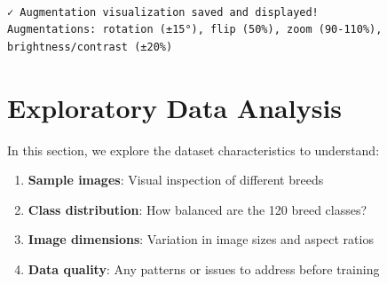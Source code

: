 \documentclass[
  letterpaper,
  DIV=11,
  numbers=noendperiod]{scrartcl}
\providecommand{\tightlist}{%
  \setlength{\itemsep}{0pt}\setlength{\parskip}{0pt}}
\begin{document}
\begin{verbatim}

✓ Augmentation visualization saved and displayed!
Augmentations: rotation (±15°), flip (50%), zoom (90-110%), brightness/contrast (±20%)
\end{verbatim}

\section{Exploratory Data Analysis}\label{exploratory-data-analysis}

In this section, we explore the dataset characteristics to understand:

\begin{enumerate}
\def\labelenumi{\arabic{enumi}.}
\tightlist
\item
  \textbf{Sample images}: Visual inspection of different breeds
\item
  \textbf{Class distribution}: How balanced are the 120 breed classes?
\item
  \textbf{Image dimensions}: Variation in image sizes and aspect ratios
\item
  \textbf{Data quality}: Any patterns or issues to address before
  training
\end{enumerate}
\end{document}
